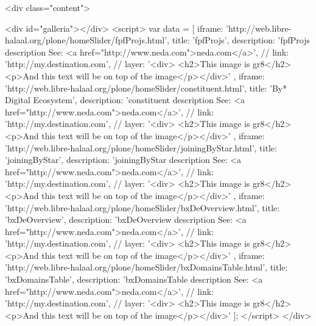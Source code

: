 \begin{rawhtml}
    <div class="content">

        <div id="galleria"></div> 
	<script>
	  var data = [
	  {
          iframe: 'http://web.libre-halaal.org/plone/homeSlider/fpfProjs.html',
          title: 'fpfProjs',
          description: 'fpfProjs description See: <a href="http://www.neda.com">neda.com</a>',
          // link: 'http://my.destination.com',
          // layer: '<div> <h2>This image is gr8</h2><p>And this text will be on top of the image</p></div>'
	  }
            ,
	  {
          iframe: 'http://web.libre-halaal.org/plone/homeSlider/constituent.html',
          title: 'By* Digital Ecosystem',
          description: 'constituent description See: <a href="http://www.neda.com">neda.com</a>',
          // link: 'http://my.destination.com',
          // layer: '<div> <h2>This image is gr8</h2><p>And this text will be on top of the image</p></div>'
	  }
            ,
	  {
          iframe: 'http://web.libre-halaal.org/plone/homeSlider/joiningByStar.html',
          title: 'joiningByStar',
          description: 'joiningByStar description See: <a href="http://www.neda.com">neda.com</a>',
          // link: 'http://my.destination.com',
          // layer: '<div> <h2>This image is gr8</h2><p>And this text will be on top of the image</p></div>'
	  }
            ,
	  {
          iframe: 'http://web.libre-halaal.org/plone/homeSlider/bxDeOverview.html',
          title: 'bxDeOverview',
          description: 'bxDeOverview description See: <a href="http://www.neda.com">neda.com</a>',
          // link: 'http://my.destination.com',
          // layer: '<div> <h2>This image is gr8</h2><p>And this text will be on top of the image</p></div>'
	  }
            ,
	  {
          iframe: 'http://web.libre-halaal.org/plone/homeSlider/bxDomainsTable.html',
          title: 'bxDomainsTable',
          description: 'bxDomainsTable description See: <a href="http://www.neda.com">neda.com</a>',
          // link: 'http://my.destination.com',
          // layer: '<div> <h2>This image is gr8</h2><p>And this text will be on top of the image</p></div>'
	  }
	  ];
       	</script>
    </div>
\end{rawhtml}
